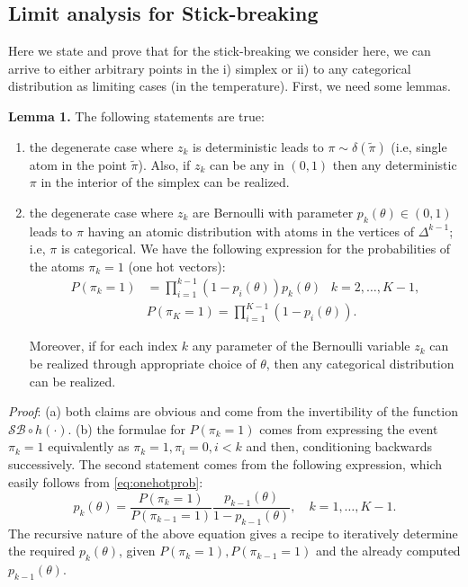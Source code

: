 \documentclass[twoside]{article}
\begin{document}
\subsection*{Limit analysis for Stick-breaking}

Here we state and prove that for  the stick-breaking we consider here, we can arrive to either arbitrary points in the i) simplex or ii) to any categorical distribution as limiting cases (in the temperature).  First, we need some lemmas.


\textbf{Lemma 1.}  The following statements are true:
\begin{enumerate} \item the degenerate case where  $z_k$ is deterministic leads to $\pi\sim \delta(\tilde{\pi})$  (i.e, single atom in the point $\tilde{\pi}$). Also, if $z_k$ can be any in $(0,1)$ then any deterministic $\pi$ in the interior of the simplex can be realized.
\item the degenerate case where  $z_k$ are Bernoulli with parameter $p_k(\theta) \in (0,1)$ leads to $\pi$ having an atomic distribution with atoms in the vertices of $\Delta^{k-1}$; i.e, $\pi$ is categorical. We have the following expression for the probabilities of the atoms $\pi_k=1$ (one hot vectors):
\begin{align}
\label{eq:onehotprob}
\nonumber P(\pi_k =1)&= \prod_{i=1}^{k-1} (1-p_i(\theta)) p_k(\theta)  \;\; \ k=2, \ldots, K-1,\\  \nonumber & P(\pi_K =1) = \prod_{i=1}^{K-1} (1-p_i(\theta)).
\end{align}

Moreover, if for each index $k$ any parameter of the Bernoulli variable $z_k$ can be realized through appropriate choice of $\theta$, then any categorical distribution can be realized.

\end{enumerate}
\textit{Proof}: (a) both claims are obvious and come from the invertibility of the function $\mathcal{SB} \circ h (\cdot)$. (b) the formulae for $P(\pi_k =1)$ comes from expressing the event $\pi_k=1$ equivalently as $\pi_k=1,\pi_i=0, i<k$ and then, conditioning backwards successively. The second statement comes from the following expression, which easily follows  from \eqref{eq:onehotprob}:
$$ p_k(\theta)=\frac{P(\pi_k =1)}{P(\pi_{k-1} =1)}\frac{p_{k-1}(\theta)}{1-p_{k-1}(\theta)},\quad k =1,\ldots, K-1.$$
The recursive nature of the above equation gives a recipe to iteratively determine the required $p_k(\theta)$, given  $P(\pi_k =1), P(\pi_{k-1} =1)$ and the already computed $p_{k-1}(\theta)$.
\end{document}
